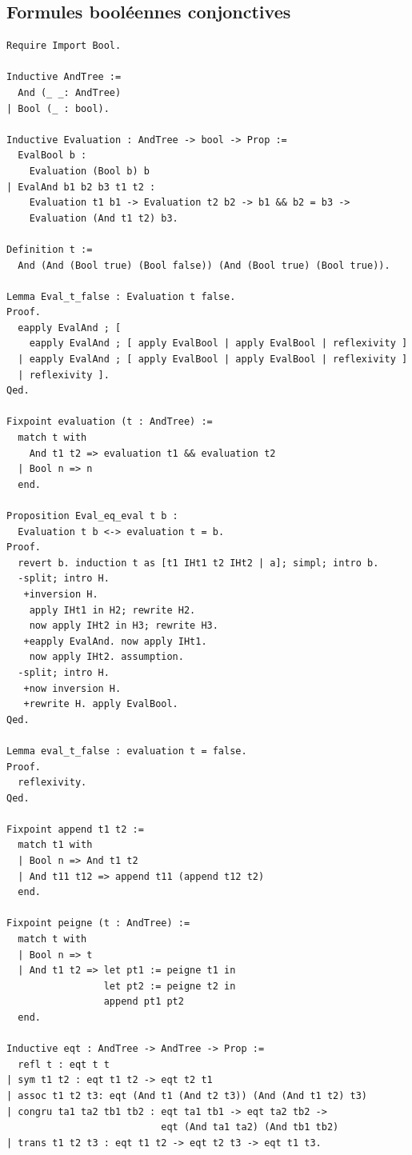 \documentclass[11pt]{article}
\begin{document}
\subsection{Formules booléennes conjonctives} \label{annexe_peigne}

\begin{lstlisting}[frame=single]
Require Import Bool.

Inductive AndTree :=
  And (_ _: AndTree)
| Bool (_ : bool).

Inductive Evaluation : AndTree -> bool -> Prop :=
  EvalBool b :
    Evaluation (Bool b) b
| EvalAnd b1 b2 b3 t1 t2 :
    Evaluation t1 b1 -> Evaluation t2 b2 -> b1 && b2 = b3 ->
    Evaluation (And t1 t2) b3.

Definition t :=
  And (And (Bool true) (Bool false)) (And (Bool true) (Bool true)).

Lemma Eval_t_false : Evaluation t false.
Proof.
  eapply EvalAnd ; [
    eapply EvalAnd ; [ apply EvalBool | apply EvalBool | reflexivity ]
  | eapply EvalAnd ; [ apply EvalBool | apply EvalBool | reflexivity ]
  | reflexivity ].
Qed.

Fixpoint evaluation (t : AndTree) :=
  match t with
    And t1 t2 => evaluation t1 && evaluation t2
  | Bool n => n
  end.

Proposition Eval_eq_eval t b :
  Evaluation t b <-> evaluation t = b.
Proof.  
  revert b. induction t as [t1 IHt1 t2 IHt2 | a]; simpl; intro b.
  -split; intro H.
   +inversion H.
    apply IHt1 in H2; rewrite H2.
    now apply IHt2 in H3; rewrite H3.
   +eapply EvalAnd. now apply IHt1.
    now apply IHt2. assumption.
  -split; intro H.
   +now inversion H.
   +rewrite H. apply EvalBool.
Qed.
   
Lemma eval_t_false : evaluation t = false.
Proof.
  reflexivity.
Qed.

Fixpoint append t1 t2 :=
  match t1 with
  | Bool n => And t1 t2
  | And t11 t12 => append t11 (append t12 t2)
  end. 

Fixpoint peigne (t : AndTree) :=
  match t with
  | Bool n => t
  | And t1 t2 => let pt1 := peigne t1 in
                 let pt2 := peigne t2 in
                 append pt1 pt2
  end.

Inductive eqt : AndTree -> AndTree -> Prop :=
  refl t : eqt t t
| sym t1 t2 : eqt t1 t2 -> eqt t2 t1
| assoc t1 t2 t3: eqt (And t1 (And t2 t3)) (And (And t1 t2) t3)
| congru ta1 ta2 tb1 tb2 : eqt ta1 tb1 -> eqt ta2 tb2 ->
                           eqt (And ta1 ta2) (And tb1 tb2)
| trans t1 t2 t3 : eqt t1 t2 -> eqt t2 t3 -> eqt t1 t3.


\end{lstlisting}
\end{document}
